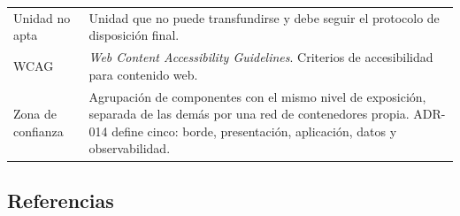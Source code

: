 \documentclass[11pt,a4paper]{article}
\begin{document}
\begin{longtable}{L{3.6cm} L{11.0cm}}
Unidad no apta & Unidad que no puede transfundirse y debe seguir el protocolo de disposición final. \\
WCAG & \emph{Web Content Accessibility Guidelines}. Criterios de accesibilidad para contenido web. \\
Zona de confianza & Agrupación de componentes con el mismo nivel de exposición, separada de las demás por una red de contenedores propia. ADR-014 define cinco: borde, presentación, aplicación, datos y observabilidad. \\
\end{longtable}

\subsection{Referencias}
\end{document}
